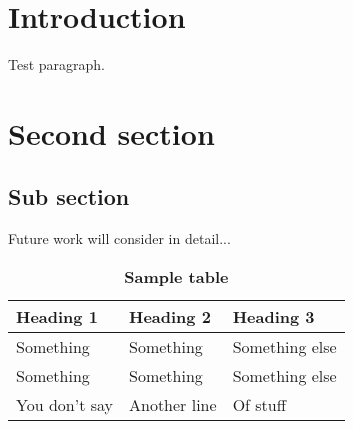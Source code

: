 \section{Introduction}

Test paragraph. \cite{Gelman2020}

\section{Second section}

\subsection{Sub section}

Future work will consider in detail... 


\begin{table}[htb]
\centering
\caption{\textbf{Sample table}}
\begin{tabular}{p{2cm}p{2cm}p{2cm}}
Heading 1 & Heading 2 & Heading 3 \\
\midrule
Something & Something & Something else \\ \greyrule
Something & Something & Something else \\ \greyrule
You don't say  & Another line & Of stuff \\ 
\bottomrule
\end{tabular}
\end{table}

\FloatBarrier
\def\UrlBreaks{\do\/\do-} %
\newpage



